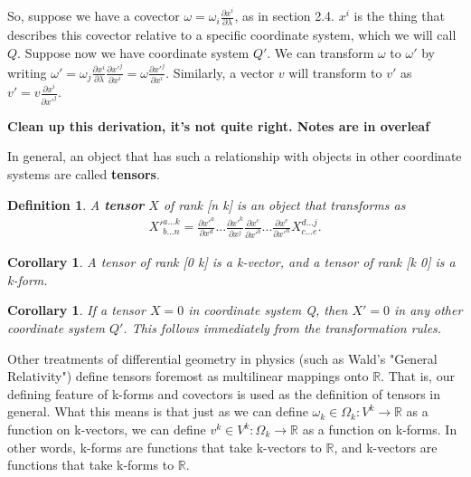 \documentclass{book}
\newtheorem{defn}[equation]{Definition}
\newtheorem{coro}[equation]{Corollary}
\begin{document}
So, suppose we have a covector $\omega = \omega_i \frac{\partial x^i}{\partial \lambda}$, as in section 2.4. $x^i$ is the thing that describes this covector relative to a specific coordinate system, which we will call $Q$. Suppose now we have coordinate system $Q'$. We can transform $\omega$ to $\omega'$ by writing $\omega' = \omega_j \frac{\partial x^i}{\partial \lambda} \frac{\partial x'^j}{\partial x^i} = \omega \frac{\partial x'^j}{\partial x^i}$. Similarly, a vector $v$ will transform to $v'$ as $v' = v \frac{\partial x^i}{\partial x'^j}$. 

\textbf{Clean up this derivation, it's not quite right. Notes are in overleaf}

In general, an object that has such a relationship with objects in other coordinate systems are called \textbf{tensors}. 



\begin{defn}
	A \textbf{tensor} $X$ of rank [n k] is an object that transforms as \begin{gather}X'^{a...k}_{b...n} = \frac{\partial x'^a}{\partial x^d} ... \frac{\partial x'^k}{\partial x^j} \frac{\partial x^c}{\partial x'^b} ... \frac{\partial x^e}{\partial x'^n} X^{d...j}_{c...e}.\end{gather} 
\end{defn}

\begin{coro}
	A tensor of rank [0 k] is a k-vector, and a tensor of rank [k 0] is a k-form. 
\end{coro}



\begin{coro}
	If a tensor $X = 0$ in coordinate system Q, then $X' = 0$ in any other coordinate system $Q'$. This follows immediately from the transformation rules. 
\end{coro}

Other treatments of differential geometry in physics (such as Wald's "General Relativity") define tensors foremost as multilinear mappings onto $\mathbb{R}$. That is, our defining feature of k-forms and covectors is used as the definition of tensors in general. What this means is that just as we can define $\omega_k \in \Omega_k : V^k \to \mathbb{R}$ as a function on k-vectors, we can define $v^k \in V^k : \Omega_k \to \mathbb{R}$ as a function on k-forms. In other words, k-forms are functions that take k-vectors to $\mathbb{R}$, and k-vectors are functions that take k-forms to $\mathbb{R}$. 
\end{document}
